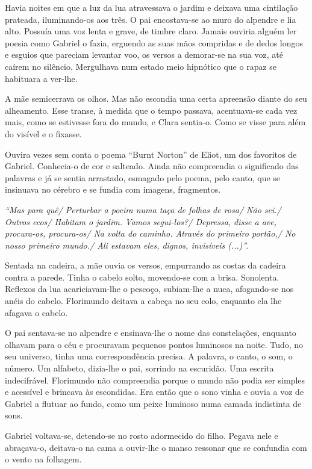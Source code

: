 Havia noites em que a luz da lua atravessava o jardim e deixava uma
cintilação prateada, iluminando-os aos três. O pai encostava-se ao muro
do alpendre e lia alto. Possuía uma voz lenta e grave, de timbre claro.
Jamais ouviria alguém ler poesia como Gabriel o fazia, erguendo as suas
mãos compridas e de dedos longos e esguios que pareciam levantar voo, os
versos a demorar-se na sua voz, até caírem no silêncio. Mergulhava num
estado meio hipnótico que o rapaz se habituara a ver-lhe.

A mãe semicerrava os olhos. Mas não escondia uma certa apreensão diante
do seu alheamento. Esse transe, à medida que o tempo passava,
acentuava-se cada vez mais, como se estivesse fora do mundo, e Clara
sentia-o. Como se visse para além do visível e o fixasse.

Ouvira vezes sem conta o poema ``Burnt Norton'' de Eliot, um dos
favoritos de Gabriel. Conhecia-o de cor e salteado. Ainda não
compreendia o significado das palavras e já se sentia arrastado,
esmagado pelo poema, pelo canto, que se insinuava no cérebro e se fundia
com imagens, fragmentos.

\emph{``Mas para quê/ Perturbar a poeira numa taça de folhas de rosa/
Não sei./ Outros ecos/ Habitam o jardim. Vamos segui-los?/ Depressa,
disse a ave, procura-os, procura-os/ Na volta do caminho. Através do
primeiro portão,/ No nosso primeiro mundo./ Ali estavam eles, dignos,
invisíveis (...)''.}

Sentada na cadeira, a mãe ouvia os versos, empurrando as costas da
cadeira contra a parede. Tinha o cabelo solto, movendo-se com a brisa.
Sonolenta. Reflexos da lua acariciavam-lhe o pescoço, subiam-lhe a nuca,
afogando-se nos anéis do cabelo. Florimundo deitava a cabeça no seu
colo, enquanto ela lhe afagava o cabelo.

O pai sentava-se no alpendre e ensinava-lhe o nome das constelações,
enquanto olhavam para o céu e procuravam pequenos pontos luminosos na
noite. Tudo, no seu universo, tinha uma correspondência precisa. A
palavra, o canto, o som, o número. Um alfabeto, dizia-lhe o pai,
sorrindo na escuridão. Uma escrita indecifrável. Florimundo não
compreendia porque o mundo não podia ser simples e acessível e brincava
às escondidas. Era então que o sono vinha e ouvia a voz de Gabriel a
flutuar ao fundo, como um peixe luminoso numa camada indistinta de sons.

Gabriel voltava-se, detendo-se no rosto adormecido do filho. Pegava nele
e abraçava-o, deitava-o na cama a ouvir-lhe o manso ressonar que se
confundia com o vento na folhagem.

